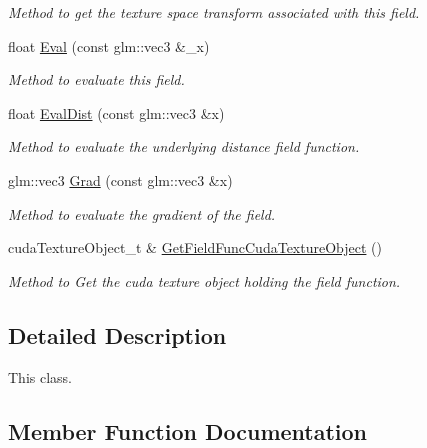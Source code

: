 \begin{DoxyCompactItemize}
\begin{DoxyCompactList}\small\item\em Method to get the texture space transform associated with this field. \end{DoxyCompactList}\item 
float \hyperlink{classFieldFunction_a3ebf983af67f0911d617f7a478c78e9e}{Eval} (const glm\+::vec3 \&\+\_\+x)
\begin{DoxyCompactList}\small\item\em Method to evaluate this field. \end{DoxyCompactList}\item 
float \hyperlink{classFieldFunction_a0e41ea0b392ce837a60612877a1cfc13}{Eval\+Dist} (const glm\+::vec3 \&x)
\begin{DoxyCompactList}\small\item\em Method to evaluate the underlying distance field function. \end{DoxyCompactList}\item 
glm\+::vec3 \hyperlink{classFieldFunction_ae97e058aee362726896d8a6461ead04f}{Grad} (const glm\+::vec3 \&x)
\begin{DoxyCompactList}\small\item\em Method to evaluate the gradient of the field. \end{DoxyCompactList}\item 
cuda\+Texture\+Object\+\_\+t \& \hyperlink{classFieldFunction_a886866186fe0ee38dbb80e3996981797}{Get\+Field\+Func\+Cuda\+Texture\+Object} ()\hypertarget{classFieldFunction_a886866186fe0ee38dbb80e3996981797}{}\label{classFieldFunction_a886866186fe0ee38dbb80e3996981797}

\begin{DoxyCompactList}\small\item\em Method to Get the cuda texture object holding the field function. \end{DoxyCompactList}\end{DoxyCompactItemize}


\subsection{Detailed Description}
This class. 

\subsection{Member Function Documentation}
